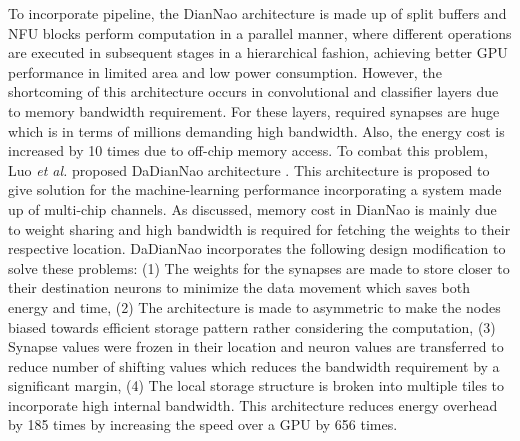 \documentclass[journal]{IEEEtran}
\begin{document}
\par To incorporate pipeline, the DianNao architecture is made up of split buffers and NFU blocks perform computation in a parallel manner, where different operations are executed in subsequent stages in a hierarchical fashion, achieving better GPU performance in limited area and low power consumption. However, the shortcoming of this architecture occurs in convolutional and classifier layers due to memory bandwidth requirement. For these layers, required synapses are huge which is in terms of millions demanding high bandwidth. Also, the energy cost is increased by 10 times due to off-chip memory access. To combat this problem, Luo \textit{et al.} proposed DaDianNao architecture \cite{paper22}. This architecture is proposed to give solution for the machine-learning performance incorporating a system made up of multi-chip channels. As discussed, memory cost in DianNao is mainly due to weight sharing and high bandwidth is required for fetching the weights to their respective location. DaDianNao incorporates the following design modification to solve these problems: (1) The weights for the synapses are made to store closer to their destination neurons to minimize the data movement which saves both energy and time, (2) The architecture is made to asymmetric to make the nodes biased towards efficient storage pattern rather considering the computation, (3) Synapse values were frozen in their location and neuron values are transferred to reduce number of shifting values which reduces the bandwidth requirement by a significant margin, (4) The local storage structure is broken into multiple tiles to incorporate high internal bandwidth. This architecture reduces energy overhead by 185 times by increasing the speed over a GPU by 656 times. 
\end{document}
